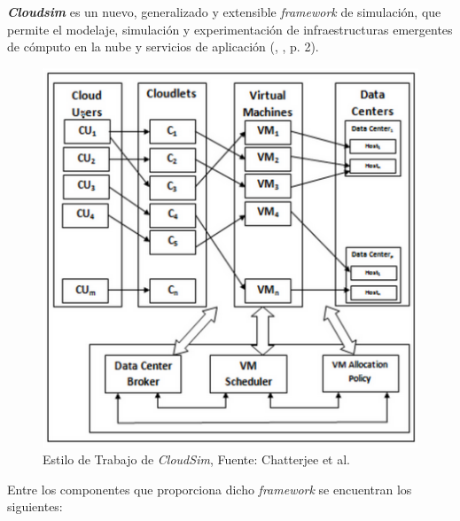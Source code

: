  \textit{\textbf{Cloudsim}} es un nuevo, generalizado y extensible \textit{framework} de simulaci\'on, que permite el modelaje, simulaci\'on y experimentaci\'on de infraestructuras emergentes de c\'omputo en la nube y servicios de aplicaci\'on (\citeauthor{calheiros2011cloudsim}, \citeyear{calheiros2011cloudsim}, p. 2).


\setcounter{figure}{2}
\renewcommand\thefigure{\arabic{figure}}
\begin{figure}[h!]
	\centering
	\includegraphics[scale=0.5]{media/imagenuno}
	\caption{Estilo de Trabajo de \textit{CloudSim}, Fuente: Chatterjee et al.}
	\label{fig:TrabajoCloudsim}
	
\end{figure}


Entre los componentes que proporciona dicho \textit{framework} se encuentran los siguientes:

